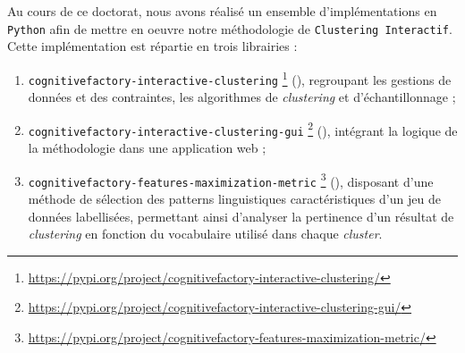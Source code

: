 \DontFrameThisInToc
{}
\label{annex:C-ANNEXE-IMPLEMENTATIONS}

	Au cours de ce doctorat, nous avons réalisé un ensemble d'implémentations en \texttt{Python} afin de mettre en oeuvre notre méthodologie de \texttt{Clustering Interactif}.
	Cette implémentation est répartie en trois librairies :
	\begin{enumerate}
		\item \texttt{cognitivefactory-interactive-clustering} \footnote{
			\url{https://pypi.org/project/cognitivefactory-interactive-clustering/}
		} (\cite{schild:2022:cognitivefactory-interactiveclustering}), regroupant les gestions de données et des contraintes, les algorithmes de \textit{clustering} et d'échantillonnage ;
		\item \texttt{cognitivefactory-interactive-clustering-gui} \footnote{
			\url{https://pypi.org/project/cognitivefactory-interactive-clustering-gui/}
		} (\cite{schild-etal:2022:cognitivefactory-interactiveclusteringgui}), intégrant la logique de la méthodologie dans une application web ;
		\item \texttt{cognitivefactory-features-maximization-metric} \footnote{
			\url{https://pypi.org/project/cognitivefactory-features-maximization-metric/}
		} (\cite{schild:2023:cognitivefactory-featuresmaximizationmetric}), disposant d'une méthode de sélection des patterns linguistiques caractéristiques d'un jeu de données labellisées, permettant ainsi d'analyser la pertinence d'un résultat de \textit{clustering} en fonction du vocabulaire utilisé dans chaque \textit{cluster}.
	\end{enumerate}
	
